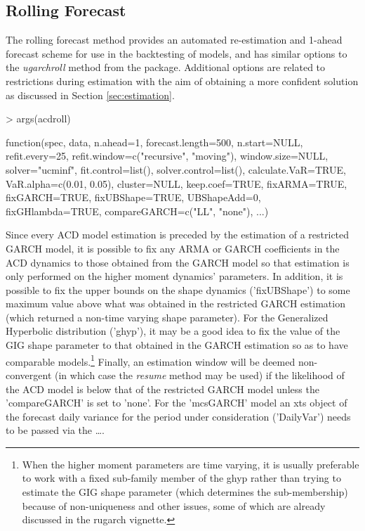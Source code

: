 \subsection{Rolling Forecast}
The rolling forecast method provides an automated re-estimation and 1-ahead forecast scheme for use in the backtesting of models, and has similar options to the \emph{ugarchroll} method from the \verb@rugarch@ package. Additional options are related to restrictions during estimation with the aim of obtaining a more confident solution as discussed in Section \ref{sec:estimation}.
\begin{Schunk}
\begin{Sinput}
> args(acdroll)
\end{Sinput}
\begin{Soutput}
function(spec, data, n.ahead=1, forecast.length=500,
n.start=NULL, refit.every=25,
refit.window=c("recursive", "moving"), window.size=NULL,
solver="ucminf", fit.control=list(), solver.control=list(),
calculate.VaR=TRUE, VaR.alpha=c(0.01, 0.05), cluster=NULL,
keep.coef=TRUE, fixARMA=TRUE, fixGARCH=TRUE, fixUBShape=TRUE,
UBShapeAdd=0, fixGHlambda=TRUE,
compareGARCH=c("LL", "none"), ...)
\end{Soutput}
\end{Schunk}
Since every ACD model estimation is preceded by the estimation of a restricted GARCH model, it is possible to fix any ARMA or GARCH coefficients in the ACD dynamics to those obtained from the GARCH model so that estimation is only performed on the higher moment dynamics' parameters. In addition, it is possible to fix the upper bounds on the shape dynamics ('fixUBShape') to some maximum value above what was obtained in the restricted GARCH estimation (which returned a non-time varying shape parameter). For the Generalized Hyperbolic distribution ('ghyp'), it may be a good idea to fix the value of the GIG shape parameter to that obtained in the GARCH estimation so as to have comparable models.\footnote{When the higher moment parameters are time varying, it is usually preferable to work with a fixed sub-family member of the ghyp rather than trying to estimate the GIG shape parameter (which determines the sub-membership) because of non-uniqueness and other issues, some of which are already discussed in the rugarch vignette.} Finally, an estimation window will be deemed non-convergent (in which case the \emph{resume} method may be used) if the likelihood of the ACD model is below that of the restricted GARCH model unless the 'compareGARCH' is set to 'none'. For the 'mcsGARCH' model an xts object of the forecast daily variance for the period under consideration ('DailyVar') needs to be passed via the \dots.\\
